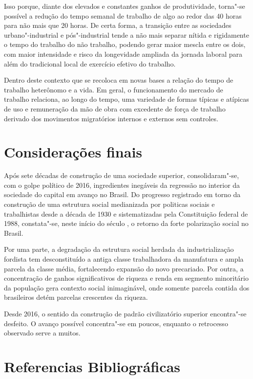 Isso porque, diante dos elevados e constantes ganhos de produtividade,
torna"-se possível a redução do tempo semanal de trabalho de algo ao
redor das 40 horas para não mais que 20 horas. De certa forma, a
transição entre as sociedades urbano"-industrial e pós"-industrial tende a
não mais separar nítida e rigidamente o tempo do trabalho do não
trabalho, podendo gerar maior mescla entre os dois, com maior
intensidade e risco da longevidade ampliada da jornada laboral para além
do tradicional local de exercício efetivo do trabalho.

Dentro deste contexto que se recoloca em novas bases a relação do tempo
de trabalho heterônomo e a vida. Em geral, o funcionamento do mercado de
trabalho relaciona, ao longo do tempo, uma variedade de formas típicas e
atípicas de uso e remuneração da mão de obra com excedente de força de
trabalho derivado dos movimentos migratórios internos e externos sem
controles.

\section{Considerações finais}

Após sete décadas de construção de uma sociedade superior,
consolidaram"-se, com o golpe político de 2016, ingredientes inegáveis da
regressão no interior da sociedade do capital em avanço no Brasil. Do
progresso registrado em torno da construção de uma estrutura social
medianizada por politicas sociais e trabalhistas desde a década de 1930
e sistematizadas pela Constituição federal de 1988, constata"-se, neste
início do século , o retorno da forte polarização social no Brasil.

Por uma parte, a degradação da estrutura social herdada da
industrialização fordista tem desconstituído a antiga classe
trabalhadora da manufatura e ampla parcela da classe média, fortalecendo
expansão do novo precariado. Por outra, a concentração de ganhos
significativos de riqueza e renda em segmento minoritário da população
gera contexto social inimaginável, onde somente parcela contida dos
brasileiros detém parcelas crescentes da riqueza.

Desde 2016, o sentido da construção de padrão civilizatório superior
encontra"-se desfeito. O avanço possível concentra"-se em poucos, enquanto
o retrocesso observado serve a muitos.

\section{Referencias Bibliográficas}

